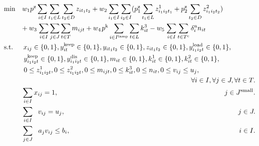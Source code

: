 \begin{center}
\begin{align}
&\textrm{min} \hspace{1.0em} {w_1 p^{\rm{z}} \sum_{i \in I} \sum_{t_1 \in L}  \sum_{t_2 \in D} {z_{it_1t_2}}}
+ {w_2 \sum_{i_1 \in I} \sum_{i_2 \in I} (p_1^{\rm{z}} \sum_{t_1 \in L} {z_{i_1i_2t_1}^1} + p_2^{\rm{z}} \sum_{t_2 \in D} {z_{i_1i_2t_2}^2} )} \notag \\
&\hspace{2.45em} + {w_3 \hspace{0.1em} \sum_{i \in I} \sum_{j\in J} \sum_{t \in T}  {m_{ijt}} }
+ {w_4 \hspace{0.1em} p^{\rm{k}} \sum_{i \in I^{\rm{lamp}}} \sum_{t \in L} {k_{it}^3}}
- {w_5 \hspace{0.1em} \sum_{i \in I} \sum_{t \in T^{\rm{c}}} \delta_i^{\rm{n}} {n_{it}}} \\
&\textrm{s.t.} \hspace{1.5em} x_{ij} \in \{ 0 , 1 \}, {y_{it}^{\rm{keep}}} \in \{ 0 , 1 \}, {y_{it_1t_2}} \in \{ 0 , 1 \}, z_{it_1t_2} \in \{ 0 , 1 \},  {y_{i_1i_2t}^{\rm{load}}} \in \{ 0 , 1 \}, \notag \\
&\hspace{2.9em}  {y_{i_1i_2t}^{\rm{keep}}} \in \{ 0 , 1 \}, {y_{i_1i_2t}^{\rm{dis}}} \in \{ 0 , 1 \}, {m_{it}} \in \{ 0 , 1 \}, {k^1_{it}} \in \{ 0 , 1 \}, {k^2_{it}} \in \{ 0 , 1 \}, \notag \\
&\hspace{2.9em} 0 \leq z_{i_1i_2t}^1, 0 \leq z_{i_1i_2t}^2, 0 \leq m_{ijt}, 0 \leq k^3_{it}, 0 \leq n_{it}, 0 \leq v_{ij} \leq u_j, \notag \\
&\hspace{2.9em}  \hspace{24.48em} \forall i \in I, \forall j \in J, \forall t \in T. \\
&\hspace{2.6em} \sum_{i \in I} x_{ij} = 1, \hspace{24.34em} j \in J^{\rm{small}}. \\
&\hspace{2.6em} \sum_{i \in I} {\hspace{0.6em}v_{ij}} = u_j, \hspace{25.33em} j \in J. \\
&\hspace{2.6em} \sum_{j \in J} {\hspace{0.65em}a_{j}}{v_{ij}} \leq {b_{i}}, \hspace{24.7em} i \in I. \\

\end{align}
\end{center}

